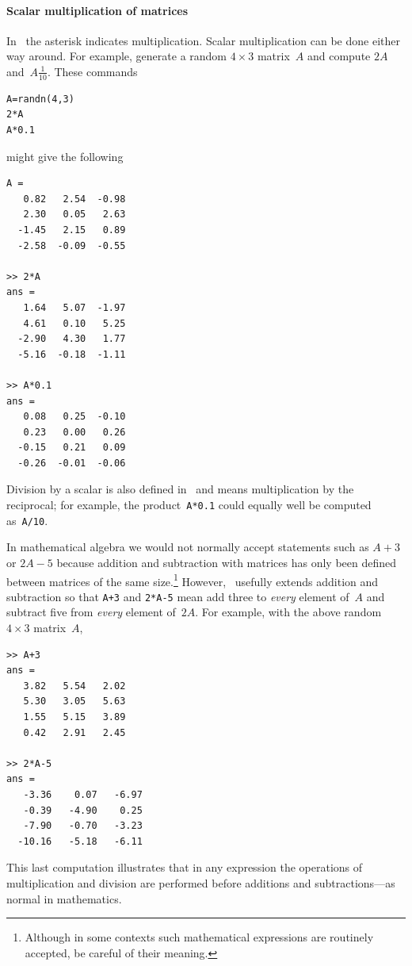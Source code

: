 \paragraph{Scalar multiplication of matrices}
In \script\ the asterisk indicates multiplication.
Scalar multiplication can be done either way around.
For example, generate a random \(4\times 3\) matrix~\(A\) and compute \(2A\) and~\(A\frac1{10}\).
These commands 
\begin{verbatim}
A=randn(4,3)
2*A
A*0.1
\end{verbatim}
\setbox\ajrqrbox\hbox{}%
\marginpar{\usebox{\ajrqrbox\\[2ex]}}%
might give the following \twodp
\begin{verbatim}
A =
   0.82   2.54  -0.98
   2.30   0.05   2.63
  -1.45   2.15   0.89
  -2.58  -0.09  -0.55

>> 2*A
ans =
   1.64   5.07  -1.97
   4.61   0.10   5.25
  -2.90   4.30   1.77
  -5.16  -0.18  -1.11

>> A*0.1
ans =
   0.08   0.25  -0.10
   0.23   0.00   0.26
  -0.15   0.21   0.09
  -0.26  -0.01  -0.06
\end{verbatim}
Division by a scalar is also defined in \script\ and means multiplication by the reciprocal; for example, the product~\verb|A*0.1| could equally well be computed as~\verb|A/10|.

In mathematical algebra we would not normally accept statements such as \(A+3\) or \(2A-5\) because addition and subtraction with matrices has only been defined between matrices of the same size.\footnote{Although in some contexts such mathematical expressions are routinely accepted, be careful of their meaning.}
However, \script\ usefully extends addition and subtraction so that \verb|A+3| and \verb|2*A-5| mean add three to \emph{every} element of~\(A\) and subtract five from \emph{every} element of~\(2A\). 
For example, with the above random \(4\times3\) matrix~\(A\),
\begin{verbatim}
>> A+3
ans =
   3.82   5.54   2.02
   5.30   3.05   5.63
   1.55   5.15   3.89
   0.42   2.91   2.45

>> 2*A-5
ans =
   -3.36    0.07   -6.97
   -0.39   -4.90    0.25
   -7.90   -0.70   -3.23
  -10.16   -5.18   -6.11
\end{verbatim}
This last computation illustrates that in any expression the operations of multiplication and division are performed before additions and subtractions---as normal in mathematics.


